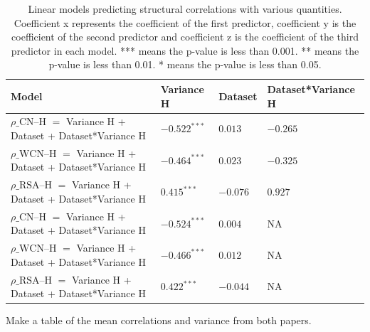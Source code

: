\documentclass[12pt]{article}
\begin{document}
\begin{center}
	\begin{table}[H]
	\begin{tabular}{ | p{5.0cm} | p{3cm} | p{3cm} | p{4cm} | }
	\hline
	Model & Variance H  & Dataset & Dataset*Variance H \\	
	\hline
	$\rho  \text{\_CN--H}$ $ = $ Variance H + Dataset + Dataset*Variance H & $-0.522^{***}$ &  $0.013$ & $-0.265$ \\[1.3cm] 	
	
	$\rho  \text{\_WCN--H}$ $ = $ Variance H + Dataset + Dataset*Variance H& $-0.464^{***}$ &  $0.023$ & $-0.325$ \\ [1.3cm] 	
	
	$\rho  \text{\_RSA--H}$ $ = $ Variance H + Dataset + Dataset*Variance H & $0.415^{***}$ & $-0.076$ & $0.927$ \\	
	
		$\rho  \text{\_CN--H}$ $ = $ Variance H + Dataset + Dataset*Variance H & $-0.524^{***}$ &  $0.004$ & NA \\[1.3cm] 	
	
	$\rho  \text{\_WCN--H}$ $ = $ Variance H + Dataset + Dataset*Variance H& $-0.466 ^{***}$ &  $ 0.012$ & NA \\ [1.3cm] 	
	
	$\rho  \text{\_RSA--H}$ $ = $ Variance H + Dataset + Dataset*Variance H & $0.422^{***}$ & $-0.044$ & NA \\	
	
	
	\hline
	\end{tabular}
	\caption{Linear models predicting structural correlations with various quantities. Coefficient x represents the coefficient of the first predictor, coefficient y is the coefficient of the second predictor and coefficient z is the coefficient of the third predictor in each model.  *** means the p-value is less than 0.001. ** means the p-value is less than 0.01.  * means the p-value is less than 0.05. }
	\label{table:model_stats}
	\end{table}
\end{center}

Make a table of the mean correlations and variance from both papers. 
\end{document}
